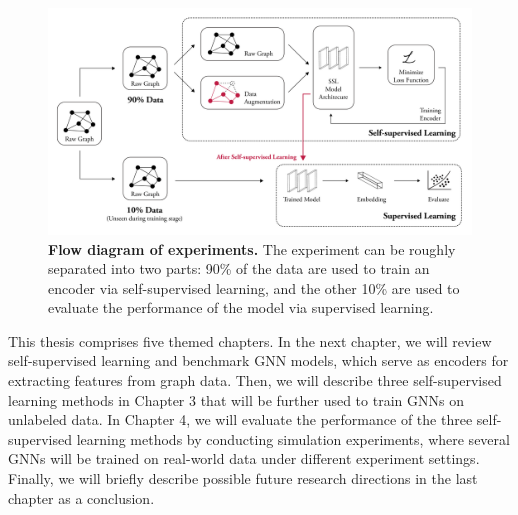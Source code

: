 \begin{figure}[!htbp]
\includegraphics[width=\textwidth]{./figures/guide-02.png}
\caption[Flow diagram of experiments]{\textbf{Flow diagram of experiments.}  The experiment can be roughly separated into two parts: 90\% of the data are used to train an encoder via self-supervised learning, and the other 10\% are used to evaluate the performance of the model via supervised learning. }
\label{fig:exp}
\end{figure}

This thesis comprises five themed chapters. In the next chapter, we will review self-supervised learning and benchmark GNN models, which serve as encoders for extracting features from graph data. Then, we will describe three self-supervised learning methods in Chapter 3 that will be further used to train GNNs on unlabeled data. In Chapter 4, we will evaluate the performance of the three self-supervised learning methods by conducting simulation experiments, where several GNNs will be trained on real-world data under different experiment settings. Finally, we will briefly describe possible future research directions in the last chapter as a conclusion.





